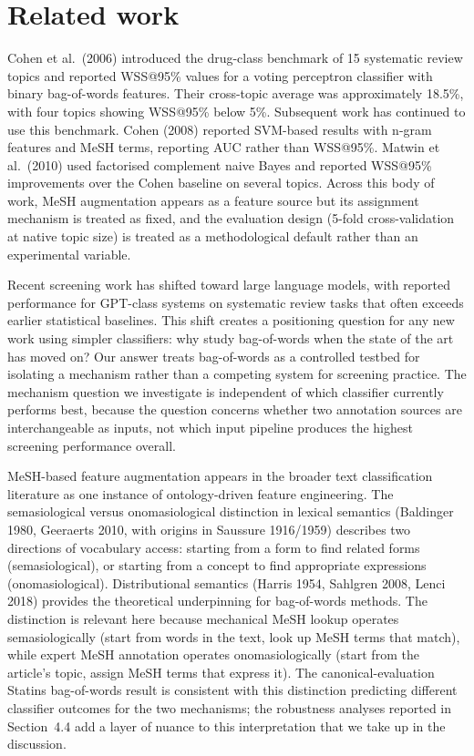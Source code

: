 \documentclass[11pt,a4paper]{article}
\begin{document}
\section{Related work}

Cohen et al.\ (2006) introduced the drug-class benchmark of 15 systematic review topics and reported WSS@95\% values for a voting perceptron classifier with binary bag-of-words features. Their cross-topic average was approximately 18.5\%, with four topics showing WSS@95\% below 5\%. Subsequent work has continued to use this benchmark. Cohen (2008) reported SVM-based results with n-gram features and MeSH terms, reporting AUC rather than WSS@95\%. Matwin et al.\ (2010) used factorised complement naive Bayes and reported WSS@95\% improvements over the Cohen baseline on several topics. Across this body of work, MeSH augmentation appears as a feature source but its assignment mechanism is treated as fixed, and the evaluation design (5-fold cross-validation at native topic size) is treated as a methodological default rather than an experimental variable.

Recent screening work has shifted toward large language models, with reported performance for GPT-class systems on systematic review tasks that often exceeds earlier statistical baselines. This shift creates a positioning question for any new work using simpler classifiers: why study bag-of-words when the state of the art has moved on? Our answer treats bag-of-words as a controlled testbed for isolating a mechanism rather than a competing system for screening practice. The mechanism question we investigate is independent of which classifier currently performs best, because the question concerns whether two annotation sources are interchangeable as inputs, not which input pipeline produces the highest screening performance overall.

MeSH-based feature augmentation appears in the broader text classification literature as one instance of ontology-driven feature engineering. The semasiological versus onomasiological distinction in lexical semantics (Baldinger 1980, Geeraerts 2010, with origins in Saussure 1916/1959) describes two directions of vocabulary access: starting from a form to find related forms (semasiological), or starting from a concept to find appropriate expressions (onomasiological). Distributional semantics (Harris 1954, Sahlgren 2008, Lenci 2018) provides the theoretical underpinning for bag-of-words methods. The distinction is relevant here because mechanical MeSH lookup operates semasiologically (start from words in the text, look up MeSH terms that match), while expert MeSH annotation operates onomasiologically (start from the article's topic, assign MeSH terms that express it). The canonical-evaluation Statins bag-of-words result is consistent with this distinction predicting different classifier outcomes for the two mechanisms; the robustness analyses reported in Section~4.4 add a layer of nuance to this interpretation that we take up in the discussion.
\end{document}
